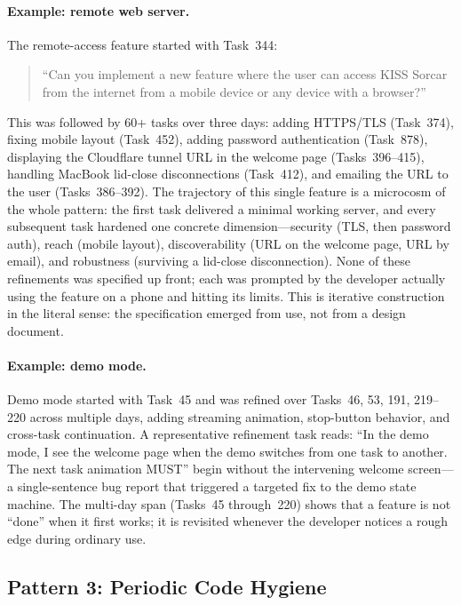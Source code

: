 \documentclass{article}
\begin{document}
\paragraph{Example: remote web server.}
The remote-access feature started with Task~344:
\begin{quote}\small
``Can you implement a new feature where the user can access KISS
Sorcar from the internet from a mobile device or any device with a
browser?''
\end{quote}
This was followed by 60+ tasks over three days: adding HTTPS/TLS
(Task~374), fixing mobile layout (Task~452), adding password
authentication (Task~878), displaying the Cloudflare tunnel URL in
the welcome page (Tasks~396--415), handling MacBook lid-close
disconnections (Task~412), and emailing the URL to the user
(Tasks~386--392).
The trajectory of this single feature is a microcosm of the whole
pattern: the first task delivered a minimal working server, and every
subsequent task hardened one concrete dimension---security (TLS, then
password auth), reach (mobile layout), discoverability (URL on the
welcome page, URL by email), and robustness (surviving a lid-close
disconnection).
None of these refinements was specified up front; each was prompted by
the developer actually using the feature on a phone and hitting its
limits.
This is iterative construction in the literal sense: the specification
emerged from use, not from a design document.

\paragraph{Example: demo mode.}
Demo mode started with Task~45 and was refined over Tasks~46, 53,
191, 219--220 across multiple days, adding streaming animation,
stop-button behavior, and cross-task continuation.
A representative refinement task reads: ``In the demo mode, I see the
welcome page when the demo switches from one task to another.  The
next task animation MUST'' begin without the intervening welcome
screen---a single-sentence bug report that triggered a targeted fix
to the demo state machine.
The multi-day span (Tasks~45 through~220) shows that a feature is not
``done'' when it first works; it is revisited whenever the developer
notices a rough edge during ordinary use.

\subsection{Pattern 3: Periodic Code Hygiene}
\label{sec:p-hygiene}
\end{document}
